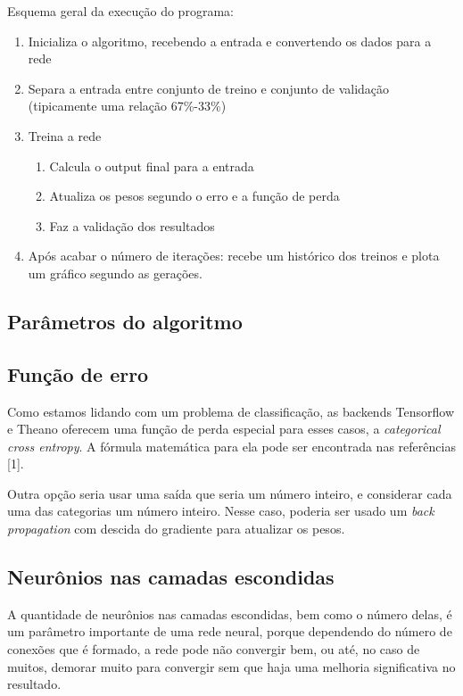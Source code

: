 \documentclass[11pt]{article}
\begin{document}
Esquema geral da execução do programa:

\begin{enumerate}
	\item Inicializa o algoritmo, recebendo a entrada e convertendo os dados para a rede
	\item Separa a entrada entre conjunto de treino e conjunto de validação (tipicamente uma relação 67\%-33\%)
	\item Treina a rede
	\begin{enumerate}
		\item Calcula o output final para a entrada
		\item Atualiza os pesos segundo o erro e a função de perda
		\item Faz a validação dos resultados
	\end{enumerate}
	\item Após acabar o número de iterações: recebe um histórico dos treinos e plota um gráfico segundo as gerações.
\end{enumerate}

\subsection{Parâmetros do algoritmo}

\subsection*{Função de erro}

Como estamos lidando com um problema de classificação, as backends Tensorflow e Theano oferecem uma função de perda especial para esses casos, a \textit{categorical cross entropy}. A fórmula matemática para ela pode ser encontrada nas referências [1].

Outra opção seria usar uma saída que seria um número inteiro, e considerar cada uma das categorias um número inteiro. Nesse caso, poderia ser usado um \textit{back propagation} com descida do gradiente para atualizar os pesos.

\subsection*{Neurônios nas camadas escondidas}

A quantidade de neurônios nas camadas escondidas, bem como o número delas, é um parâmetro importante de uma rede neural, porque dependendo do número de conexões que é formado, a rede pode não convergir bem, ou até, no caso de muitos, demorar muito para convergir sem que haja uma melhoria significativa no resultado.
\end{document}
